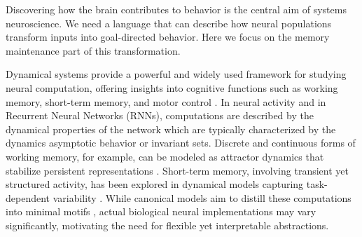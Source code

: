 \documentclass{article}
\theoremstyle{definition} \newtheorem{definition}{Definition}  \newtheorem{example}{Example}
\theoremstyle{remark} \newtheorem{remark}{Remark}
\newcounter{ct}
\begin{document}
Discovering how the brain contributes to behavior is the central aim of systems neuroscience.
We need a language that can describe how neural populations transform inputs into goal-directed behavior.
Here we focus on the memory maintenance part of this transformation.

Dynamical systems provide a powerful and widely used framework for studying neural computation, offering insights into cognitive functions such as working memory, short-term memory, and motor control \citep{beer1995ctrnn, beer2006parameterspace, sussillo2014neural, vyas2020ctd}.
In neural activity and in Recurrent Neural Networks (RNNs), computations are described by the dynamical properties of the network which are typically characterized by the dynamics asymptotic behavior or invariant sets.
Discrete and continuous forms of working memory, for example, can be modeled as attractor dynamics that stabilize persistent representations \citep{zhang2022translation, hoeller2024bridging}.
Short-term memory, involving transient yet structured activity, has been explored in dynamical models capturing task-dependent variability \citep{kurtkaya2025dynamical}.
 While canonical models aim to distill these computations into minimal motifs \citep{chirimuuta2014minimal}, actual biological neural implementations may vary significantly, motivating the need for flexible yet interpretable abstractions.
\end{document}
